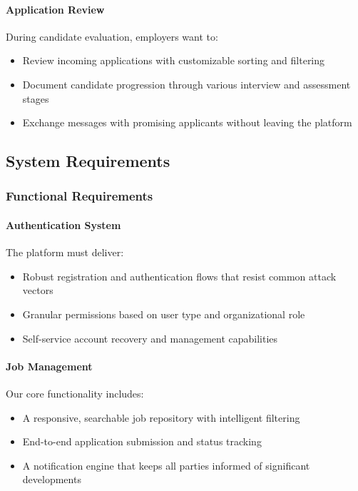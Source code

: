 \documentclass[12pt,a4paper]{article}
\begin{document}
\paragraph{Application Review}
During candidate evaluation, employers want to:
\begin{itemize}
    \item Review incoming applications with customizable sorting and filtering
    \item Document candidate progression through various interview and assessment stages
    \item Exchange messages with promising applicants without leaving the platform
\end{itemize}

\subsection{System Requirements}

\subsubsection{Functional Requirements}

\paragraph{Authentication System}
The platform must deliver:
\begin{itemize}
    \item Robust registration and authentication flows that resist common attack vectors
    \item Granular permissions based on user type and organizational role
    \item Self-service account recovery and management capabilities
\end{itemize}

\paragraph{Job Management}
Our core functionality includes:
\begin{itemize}
    \item A responsive, searchable job repository with intelligent filtering
    \item End-to-end application submission and status tracking
    \item A notification engine that keeps all parties informed of significant developments
\end{itemize}
\end{document}
